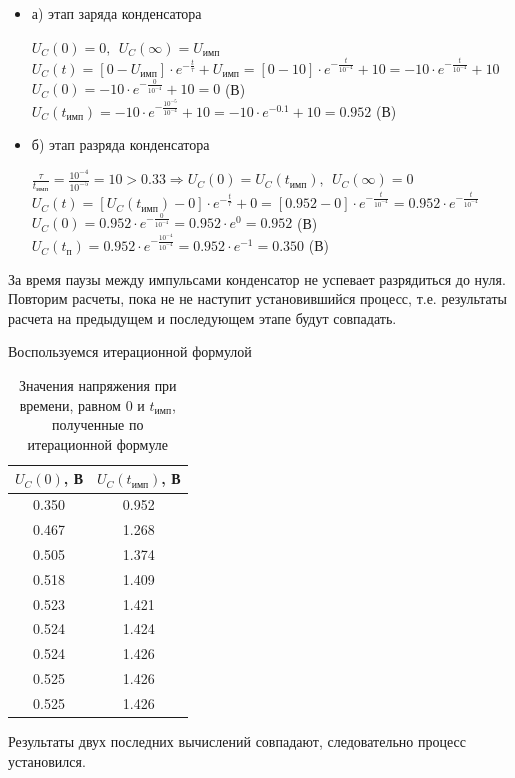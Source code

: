 \begin{itemize}
\item[] а) этап заряда конденсатора

		$U_C(0) = 0,\ \ U_C(\infty) = U_\text{имп}$\\	
		$U_C(t) = [0 - U_\text{имп}] \cdot e^{-\frac{t}{\tau}} + U_\text{имп} = [0 - 10] \cdot e^{-\frac{t}{10^{-4}}} + 10 = -10 \cdot e^{-\frac{t}{10^{-4}}} + 10$\\
		$U_C(0) = -10 \cdot e^{-\frac{0}{10^{-4}}} + 10 = 0$ (В)\\
		$U_C(t_\text{имп}) = -10 \cdot e^{-\frac{10^{-5}}{10^{-4}}} + 10 = -10 \cdot e^{-0.1} + 10 = 0.952$ (В)\\
		
\item[] б) этап разряда конденсатора
	
		$\frac{\tau}{t_\text{имп}} = \frac{10^{-4}}{10^{-5}} = 10 > 0.33 \Rightarrow U_C(0) = U_C(t_\text{имп}),\ \ U_C(\infty) = 0$\\
		$U_C(t) = [U_C(t_\text{имп}) - 0] \cdot e^{-\frac{t}{\tau}} + 0 =  [0.952 - 0] \cdot e^{-\frac{t}{10^{-4}}} = 0.952 \cdot e^{-\frac{t}{10^{-4}}}$\\
		$U_C(0) = 0.952 \cdot e^{-\frac{0}{10^{-4}}} = 0.952 \cdot e^0 = 0.952$ (В)\\
		$U_C(t_\text{п}) = 0.952 \cdot e^{-\frac{10^{-4}}{10^{-4}}} = 0.952 \cdot e^{-1} = 0.350$ (В)\\
		
\end{itemize}

	За время паузы между импульсами конденсатор не успевает разрядиться до нуля. Повторим расчеты, пока не не наступит установившийся процесс, т.е. результаты расчета на предыдущем и последующем этапе будут совпадать.	
	
	Воспользуемся итерационной формулой
\begin{table}[H]

	\begin{center}
	\caption{Значения напряжения при времени, равном $0$ и $t_\text{имп}$, полученные по итерационной формуле}
	\begin{tabular}{|c|c|}
		\hline 
		$U_C(0)$, В & $U_C(t_\text{имп})$, В \\ 
		\hline 
		0.350 & 0.952 \\ 
		\hline 
		0.467 & 1.268 \\ 
		\hline 
		0.505 & 1.374 \\ 
		\hline 
		0.518 & 1.409 \\ 
		\hline 
		0.523 & 1.421 \\ 
		\hline 
		0.524 & 1.424 \\ 
		\hline 
		0.524 & 1.426 \\ 
		\hline 
		0.525 & 1.426 \\ 
		\hline 
		0.525 & 1.426 \\
		\hline 
		\end{tabular} 	
		
	\end{center}
\end{table}
	Результаты двух последних вычислений совпадают, следовательно процесс установился.\\
	
